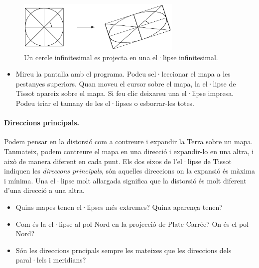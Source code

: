 \documentclass[a4paper,12pt]{article}
\begin{document}
\begin{figure}[h]
 \begin{center}
  \includegraphics[width=0.7\textwidth]{../common/tiss_diagram} 
\caption{Un cercle infinitesimal es projecta en una el·lipse infinitesimal.}%
 \end{center}
\end{figure}
\vspace{-1em}
\begin{itemize}
 \item Mireu la pantalla amb el programa. Podeu sel·leccionar el mapa a les pestanyes superiors. Quan moveu el cursor sobre el mapa, la el·lipse de Tissot apareix sobre el mapa. Si feu clic deixareu una el·lipse impresa. Podeu triar el tamany de les el·lipses o esborrar-les totes.
 
\end{itemize}



\paragraph{Direccions principals.} 
Podem pensar en la distorsió com a contreure i expandir la Terra sobre un mapa. Tanmateix, podem contreure el mapa en una direcció i expandir-lo en una altra, i això de manera diferent en cada punt. Els dos eixos de l'el·lipse de Tissot indiquen les \emph{direccons principals}, són aquelles direccions on la expansió és màxima i mínima. Una el·lipse molt allargada significa que la distorsió és molt diferent d'una direcció a una altra.



\begin{itemize}
 \item Quins mapes tenen el·lipses més extremes? Quina aparença tenen?
 \item Com és la el·lipse al pol Nord en la projecció de Plate-Carrée? On és el pol Nord? 
 \item Són les direccions prncipals sempre les mateixes que les direccions dels paral·lels i meridians?
\end{itemize}
\end{document}
